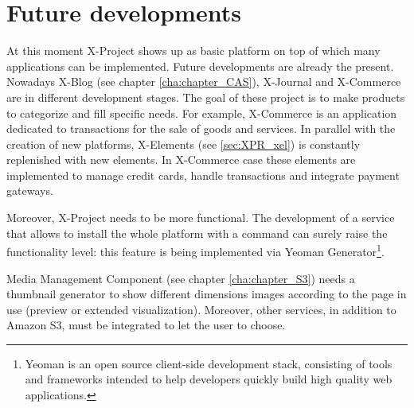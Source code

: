 \section{Future developments}
\label{sec:conclusions_future_developments}

At this moment X-Project shows up as basic platform on top of which many applications can be implemented. Future developments are already the present. Nowadays X-Blog (see chapter \ref{cha:chapter_CAS}), X-Journal and X-Commerce are in different development stages. The goal of these project is to make products to categorize and fill specific needs. For example, X-Commerce is an application dedicated to transactions for the sale of goods and services. In parallel with the creation of new platforms, X-Elements (see \ref{sec:XPR_xel}) is constantly replenished with new elements.
In X-Commerce case these elements are implemented to manage credit cards, handle transactions and integrate payment gateways.

Moreover, X-Project needs to be more functional. The development of a service that allows to install the whole platform with a command can surely raise the functionality level: this feature is being implemented via Yeoman Generator\footnote{Yeoman is an open source client-side development stack, consisting of tools and frameworks intended to help developers quickly build high quality web applications.}.

Media Management Component (see chapter \ref{cha:chapter_S3}) needs a thumbnail generator to show different dimensions images according to the page in use (preview or extended visualization). Moreover, other services, in addition to Amazon S3, must be integrated to let the user to choose.

